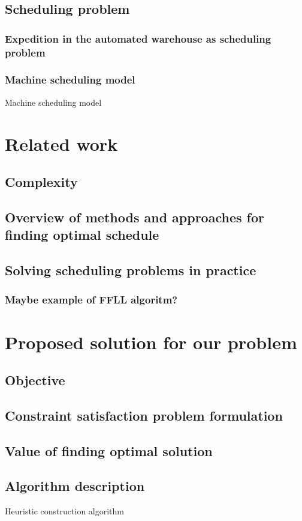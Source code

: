 \documentclass{ctuthesis}
\begin{document}
\section{Scheduling problem}


\subsection{Expedition in the automated warehouse as scheduling problem}

\subsection{Machine scheduling model}
Machine scheduling model 
\chapter{Related work}
\section{Complexity}
\section{Overview of methods and approaches for finding optimal schedule}
\section{Solving scheduling problems in practice}
\subsection{Maybe example of FFLL algoritm?}
\chapter{Proposed solution for our problem}
\section{Objective}
\section{Constraint satisfaction problem formulation}
\section{Value of finding optimal solution}
\section{Algorithm description}
Heuristic construction algorithm
\end{document}
